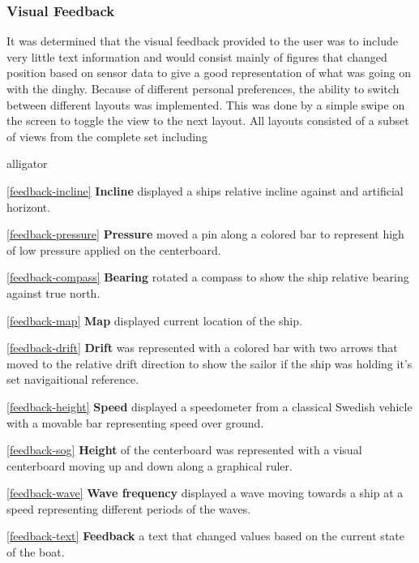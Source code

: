 \subsubsection{Visual Feedback}
It was determined that the visual feedback provided to the user was to include very little text information and would consist mainly of figures that changed position based on sensor data to give a good representation of what was going on with the dinghy. Because of different personal preferences, the ability to switch between different layouts was implemented. This was done by a simple swipe on the screen to toggle the view to the next layout. All layouts consisted of a subset of views from the complete set including
\begin{labeling}{alligator}
\item [\ref{feedback-incline} \textbf{Incline}]  displayed a ships relative incline against and artificial horizont.
\item [\ref{feedback-pressure} \textbf{Pressure}] moved a pin along a colored bar to represent high of low pressure applied on the centerboard.
\item [\ref{feedback-compass} \textbf{Bearing}] rotated a compass to show the ship relative bearing against true north.
\item [\ref{feedback-map} \textbf{Map}] displayed current location of the ship.
\item [\ref{feedback-drift} \textbf{Drift}] was represented with a colored bar with two arrows that moved to the relative drift direction to show the sailor if the ship was holding it's set navigaitional reference.
\item [\ref{feedback-height} \textbf{Speed}] displayed a speedometer from a classical Swedish vehicle\cite{volvo} with a movable bar representing speed over ground.
\item [\ref{feedback-sog} \textbf{Height}] of the centerboard was represented with a visual centerboard moving up and down along a graphical ruler.
\item [\ref{feedback-wave} \textbf{Wave frequency}] displayed a wave moving towards a ship at a speed representing different periods of the waves.
\item [\ref{feedback-text} \textbf{Feedback}] a text that changed values based on the current state of the boat.
\end{labeling}

